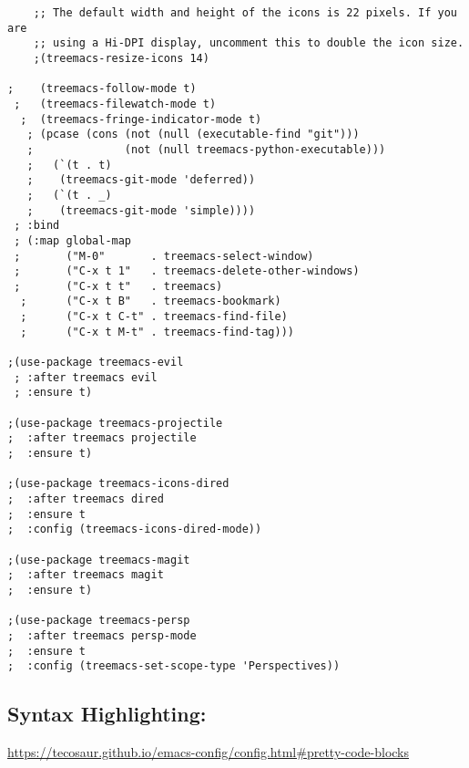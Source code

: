 \documentclass[11pt]{article}
\begin{document}
\begin{verbatim}
    ;; The default width and height of the icons is 22 pixels. If you are
    ;; using a Hi-DPI display, uncomment this to double the icon size.
    ;(treemacs-resize-icons 14)

;    (treemacs-follow-mode t)
 ;   (treemacs-filewatch-mode t)
  ;  (treemacs-fringe-indicator-mode t)
   ; (pcase (cons (not (null (executable-find "git")))
   ;              (not (null treemacs-python-executable)))
   ;   (`(t . t)
   ;    (treemacs-git-mode 'deferred))
   ;   (`(t . _)
   ;    (treemacs-git-mode 'simple))))
 ; :bind
 ; (:map global-map
 ;       ("M-0"       . treemacs-select-window)
 ;       ("C-x t 1"   . treemacs-delete-other-windows)
 ;       ("C-x t t"   . treemacs)
  ;      ("C-x t B"   . treemacs-bookmark)
  ;      ("C-x t C-t" . treemacs-find-file)
  ;      ("C-x t M-t" . treemacs-find-tag)))

;(use-package treemacs-evil
 ; :after treemacs evil
 ; :ensure t)

;(use-package treemacs-projectile
;  :after treemacs projectile
;  :ensure t)

;(use-package treemacs-icons-dired
;  :after treemacs dired
;  :ensure t
;  :config (treemacs-icons-dired-mode))

;(use-package treemacs-magit
;  :after treemacs magit
;  :ensure t)

;(use-package treemacs-persp
;  :after treemacs persp-mode
;  :ensure t
;  :config (treemacs-set-scope-type 'Perspectives))

\end{verbatim}



\subsection{Syntax Highlighting:}
\label{sec:org7559acc}
\url{https://tecosaur.github.io/emacs-config/config.html\#pretty-code-blocks}
\end{document}

